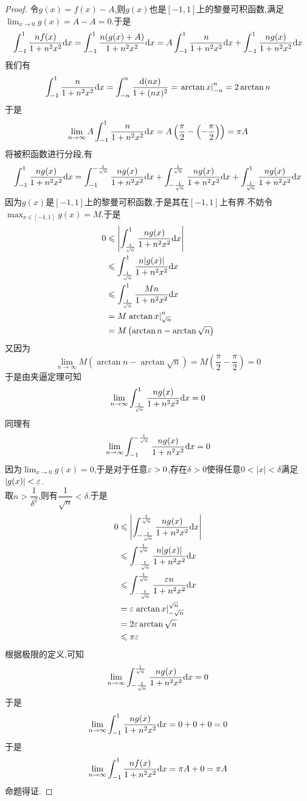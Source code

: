 \documentclass{ctexart}
\begin{document}
\begin{proof}
    令$g(x)=f(x)-A$,则$g(x)$也是$[-1,1]$上的黎曼可积函数,满足$\displaystyle\lim_{x\to0}g(x)=A-A=0$.于是
    \[\int_{-1}^{1}\dfrac{nf(x)}{1+n^2x^2}\mathrm{d} x=\int_{-1}^{1}\dfrac{n(g(x)+A)}{1+n^2x^2}\mathrm{d} x=A\int_{-1}^{1}\dfrac{n}{1+n^2x^2}\mathrm{d} x+\int_{-1}^{1}\dfrac{ng(x)}{1+n^2x^2}\mathrm{d} x\]
    我们有\[\int_{-1}^{1}\dfrac{n}{1+n^2x^2}\mathrm{d} x=\int_{-n}^{n}\dfrac{\mathrm{d}(nx)}{1+(nx)^2}=\left.\arctan x\right|_{-n}^{n}=2\arctan n\]
    于是\[\lim_{n\to\infty}A\int_{-1}^{1}\dfrac{n}{1+n^2x^2}\mathrm{d} x=A\left(\dfrac\pi2-\left(-\dfrac\pi2\right)\right)=\pi A\]
    将被积函数进行分段,有
    \[\int_{-1}^{1}\dfrac{ng(x)}{1+n^2x^2}\mathrm{d} x=\int_{-1}^{-\frac{1}{\sqrt{n}}}\dfrac{ng(x)}{1+n^2x^2}\mathrm{d} x+\int_{-\frac{1}{\sqrt{n}}}^{\frac{1}{\sqrt{n}}}\dfrac{ng(x)}{1+n^2x^2}\mathrm{d} x+\int_{\frac{1}{\sqrt{n}}}^{1}\dfrac{ng(x)}{1+n^2x^2}\mathrm{d} x\]
    因为$g(x)$是$[-1,1]$上的黎曼可积函数,于是其在$[-1,1]$上有界.不妨令$\displaystyle\max_{x\in[-1,1]}g(x)=M$.于是
    \[\begin{aligned}
        0
        &\leqslant\left|\int_{\frac{1}{\sqrt{n}}}^{1}\dfrac{ng(x)}{1+n^2x^2}\mathrm{d} x\right| \\
        &\leqslant\int_{\frac{1}{\sqrt{n}}}^{1}\dfrac{n|g(x)|}{1+n^2x^2}\mathrm{d} x \\
        &\leqslant\int_{\frac{1}{\sqrt{n}}}^{1}\dfrac{Mn}{1+n^2x^2}\mathrm{d} x \\
        &= M\left.\arctan x\right|_{\sqrt{n}}^{n} \\
        &= M\left(\arctan n-\arctan\sqrt{n}\right)
    \end{aligned}\]
    又因为
    \[\lim_{n\to\infty}M\left(\arctan n-\arctan\sqrt{n}\right)=M\left(\dfrac\pi2-\dfrac\pi2\right)=0\]
    于是由夹逼定理可知
    \[\lim_{n\to\infty}\int_{\frac{1}{\sqrt{n}}}^{1}\dfrac{ng(x)}{1+n^2x^2}\mathrm{d} x=0\]
    同理有
    \[\lim_{n\to\infty}\int_{-1}^{-\frac{1}{\sqrt{n}}}\dfrac{ng(x)}{1+n^2x^2}\mathrm{d} x=0\]
    因为$\displaystyle\lim_{x\to0}g(x)=0$,于是对于任意$\varepsilon>0$,存在$\delta>0$使得任意$0<|x|<\delta$满足$|g(x)|<\varepsilon$.\\
    取$n>\dfrac{1}{\delta^2}$,则有$\dfrac{1}{\sqrt{n}}<\delta$.于是
    \[\begin{aligned}
        0
        &\leqslant\left|\int_{-\frac{1}{\sqrt{n}}}^{\frac{1}{\sqrt{n}}}\dfrac{ng(x)}{1+n^2x^2}\mathrm{d} x\right| \\
        &\leqslant\int_{-\frac{1}{\sqrt{n}}}^{\frac{1}{\sqrt{n}}}\dfrac{n|g(x)|}{1+n^2x^2}\mathrm{d} x \\
        &\leqslant\int_{-\frac{1}{\sqrt{n}}}^{\frac{1}{\sqrt{n}}}\dfrac{\varepsilon n}{1+n^2x^2}\mathrm{d} x \\
        &= \varepsilon\left.\arctan x\right|_{-\sqrt{n}}^{\sqrt{n}} \\
        &= 2\varepsilon\arctan\sqrt{n} \\
        &\leqslant \pi\varepsilon
    \end{aligned}\]
    根据极限的定义,可知\\
    \[\lim_{n\to\infty}\int_{-\frac{1}{\sqrt{n}}}^{\frac{1}{\sqrt{n}}}\dfrac{ng(x)}{1+n^2x^2}\mathrm{d} x=0\]
    于是
    \[\lim_{n\to\infty}\int_{-1}^{1}\dfrac{ng(x)}{1+n^2x^2}\mathrm{d} x=0+0+0=0\]
    于是
    \[\lim_{n\to\infty}\int_{-1}^{1}\dfrac{nf(x)}{1+n^2x^2}\mathrm{d} x=\pi A+0=\pi A\]
    命题得证.
\end{proof}
\end{document}
